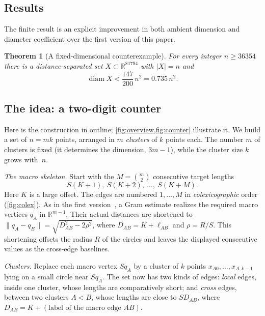 \documentclass[11pt]{amsart}
\numberwithin{equation}{section}
\newtheorem{theorem}{Theorem}[section]
\theoremstyle{definition}
\theoremstyle{remark}
\newcommand{\R}{\mathbb R}
\DeclareMathOperator{\diam}{diam}
\begin{document}
\subsection{Results}

The finite result is an explicit improvement in both ambient dimension and
diameter coefficient over the first version of this paper.

\begin{theorem}[A fixed-dimensional counterexample]\label{thm:explicit}
For every integer $n\ge36354$ there is a distance-separated set
$X\subset\R^{81794}$ with $|X|=n$ and
\[
 \diam X<\frac{147}{200}\,n^2=0.735\,n^2.
\]
\end{theorem}

\subsection{The idea: a two-digit counter}\label{sec:idea}

Here is the construction in outline; \cref{fig:overview,fig:counter}
illustrate it. We build a set of $n=mk$ points, arranged in $m$
\emph{clusters} of $k$ points each. The number $m$ of clusters is fixed
(it determines the dimension, $3m-1$), while the cluster size $k$ grows
with~$n$.

\emph{The macro skeleton.} Start with the $M=\binom m2$ consecutive
target lengths
\[
 S(K+1),\ S(K+2),\ \dots,\ S(K+M).
\]
Here $K$ is a large offset. The edges are numbered $1,\dots,M$ in
\emph{colexicographic} order (\cref{fig:colex}). As in the first
version~\cite{Tripodo}, a Gram estimate realizes the required macro vertices
$q_A$ in $\R^{m-1}$. Their actual distances are shortened to
$\|q_A-q_B\|=\sqrt{D_{AB}^2-2\rho^2}$, where $D_{AB}=K+\ell_{AB}$ and
$\rho=R/S$. This shortening offsets the radius $R$ of the circles and
leaves the displayed consecutive values as the cross-edge baselines.

\emph{Clusters.} Replace each macro vertex $Sq_A$ by a cluster of $k$
points $x_{A0},\dots,x_{A,k-1}$ lying on a small circle near $Sq_A$. The
set now has two kinds of edges: \emph{local} edges, inside one cluster,
whose lengths are comparatively short; and \emph{cross} edges, between
two clusters $A<B$, whose lengths are close to $SD_{AB}$, where
$D_{AB}=K+(\text{label of the macro edge }AB)$.
\end{document}
